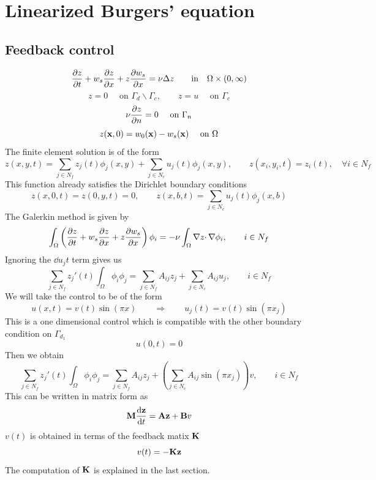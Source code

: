 \documentclass[12pt]{article}
\begin{document}

\section{Linearized Burgers' equation}

\subsection{Feedback control}
\begin{equation*}
\frac{\partial z}{\partial t} + w_s \frac{\partial z}{\partial x} + z \frac{\partial w_s}{\partial x} = \nu \Delta z \qquad \mbox{in} \quad \Omega \times (0,\infty)
\end{equation*}
\begin{equation*}
z = 0 \quad \text{ on } \Gamma_d \backslash \Gamma_c, \qquad z = u \quad \text{ on } \Gamma_c
\end{equation*}
\begin{equation*}
\nu \frac{\partial z}{\partial n} = 0 \quad \text{ on } \Gamma_n 
\end{equation*}
\begin{equation*}
z({\mathbf x},0) = w_0({\mathbf x}) - w_s({\mathbf x}) \quad \text{ on } \Omega
\end{equation*}
The finite element solution is of the form
\[
z(x,y,t) = \sum_{j \in N_f} z_j(t) \phi_j(x,y) + \sum_{j \in N_c} u_j(t) \phi_j(x,y), \qquad z(x_i,y_i,t) = z_i(t), \quad \forall i \in N_f
\]
This function already satisfies the Dirichlet boundary conditions
\[
z(x,0,t) = z(0,y,t) = 0, \qquad z(x,b,t) = \sum_{j \in N_c} u_j(t) \phi_j(x,b)
\]
The Galerkin method is given by
\begin{equation*}
\int_\Omega \left( \frac{\partial z}{\partial t} + w_s \frac{\partial z}{\partial x} + z \frac{\partial w_s}{\partial x} \right) \phi_i = - \nu \int_\Omega \nabla z \cdotp \nabla \phi_i , \qquad i \in N_f
\end{equation*}
Ignoring the $\dd{u_j}{t}$ term gives us
\[
\sum_{j \in N_f} z_j'(t) \int_\Omega \phi_i \phi_j = \sum_{j \in N_f} A_{ij} z_j + \sum_{j \in N_c} A_{ij} u_j, \qquad i \in N_f
\]
We will take the control to be of the form
\[
u(x,t) = v(t) \sin(\pi x) \qquad \Longrightarrow \qquad u_j(t) = v(t) \sin(\pi x_j)
\]
This is a one dimensional control which is compatible with the other boundary condition on $\Gamma_{d_1}$
\[
u(0,t) = 0
\]
Then we obtain
\[
\sum_{j \in N_f} z_j'(t) \int_\Omega \phi_i \phi_j = \sum_{j \in N_f} A_{ij} z_j + \left(\sum_{j \in N_c} A_{ij} \sin(\pi x_j) \right) v, \qquad i \in N_f
\]
This can be written in matrix form as
\[
{\mathbf M} \frac{\textrm{d} {\mathbf z}}{\textrm{d} t} = {\mathbf A} {\mathbf z} + {\mathbf B} v
\]
$v(t)$ is obtained in terms of the feedback matix ${\mathbf K}$ 
\[
 v(t) = - {\mathbf K} {\mathbf z}
\]
The computation of ${\mathbf K}$ is explained in the last section.
\end{document}
